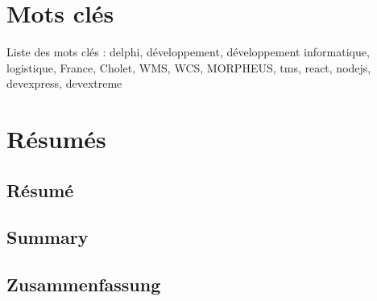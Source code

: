 \documentclass[a4paper, 12pt, french]{article}
\begin{document}
		\newpage

	\section*{Mots clés}
	Liste des mots clés : delphi, développement, développement informatique, logistique, France, Cholet, WMS, WCS, MORPHEUS, tms, react, nodejs, devexpress, devextreme
	\newpage

	\section*{Résumés}
		\subsection*{Résumé}

		\subsection*{Summary}


		\subsection*{Zusammenfassung}


	
		\newpage
\end{document}

